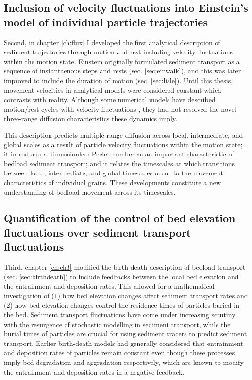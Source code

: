 \subsection{Inclusion of velocity fluctuations into Einstein's model of individual particle trajectories}

Second, in chapter \ref{ch:flux} I developed the first analytical description of sediment trajectories through motion and rest including velocity fluctuations within the motion state.
Einstein originally formulated sediment transport as a sequence of instantaenous steps and rests (sec. \ref{sec:einwalk}), and this was later improved to include the duration of motion (sec. \ref{sec:lisle}).
Until this thesis, movement velocities in analytical models were considered constant which contrasts with reality. 
Although some numerical models have described motion/rest cycles with velocity fluctuations \citep{Fan2016,Bialik2012,Schmeeckle2014}, they had not resolved the novel three-range diffusion characteristics these dynamics imply.

This description predicts multiple-range diffusion across local, intermediate, and global scales as a result of particle velocity fluctuations within the motion state; it introduces a dimensionless Peclet number as an important characteristic of bedload sediment transport; and it relates the timescales at which transitions between local, intermediate, and global timescales occur to the movement characteristics of individual grains.
These developments constitute a new understanding of bedload movement across its timescales.

\subsection{Quantification of the control of bed elevation fluctuations over sediment transport fluctuations}

Third, chapter \ref{ch:ch3} modified the birth-death description of bedload transport (sec. \ref{sec:birthdeath}) to include feedbacks between the local bed elevation and the entrainment and deposition rates.
This allowed for a mathematical investigation of (1) how bed elevation changes affect sediment transport rates and (2) how bed elevation changes control the residence times of particles buried in the bed.
Sediment transport fluctuations have come under increasing scrutiny with the resurgence of stochastic modelling in sediment transport, while the burial times of particles are crucial for using sediment tracers to predict sediment transport.
Earlier birth-death models had generally considered that entrainment and deposition rates of particles remain constant even though these processes imply bed degradation and aggradation respectively, which are known to modify the entrainment and deposition rates in a negative feedback.

